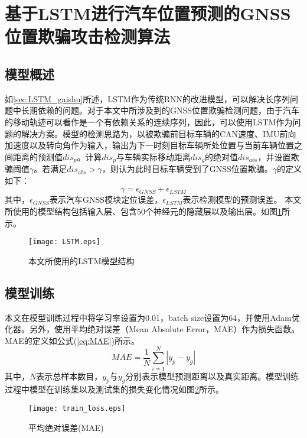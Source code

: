 \section{基于LSTM进行汽车位置预测的GNSS位置欺骗攻击检测算法}
\subsection{模型概述}
如\ref{sec:LSTM_gaishu}所述，LSTM作为传统RNN的改进模型，可以解决长序列问题中长期依赖的问题。对于本文中所涉及到的GNSS位置欺骗检测问题，由于汽车的移动轨迹可以看作是一个有依赖关系的连续序列，因此，可以使用LSTM作为问题的解决方案。模型的检测思路为，以被欺骗前目标车辆的CAN速度、IMU前向加速度以及转向角作为输入，输出为下一时刻目标车辆所处位置与当前车辆位置之间距离的预测值$dis_p$。计算$dis_p$与车辆实际移动距离$dis_g$的绝对值$dis_{abs}$，并设置欺骗阈值$\gamma$。若满足$dis_{abs}>\gamma$，则认为此时目标车辆受到了GNSS位置欺骗。$\gamma$的定义如下：
\begin{equation}
    \gamma=\epsilon_{GNSS}+\epsilon_{LSTM}
    \label{eq:gamma}
\end{equation}
其中，$\epsilon_{GNSS}$表示汽车GNSS模块定位误差，$\epsilon_{LSTM}$表示检测模型的预测误差。
本文所使用的模型结构包括输入层、包含50个神经元的隐藏层以及输出层。如图\ref{fig:my_model_arch}所示。
\begin{figure}[htbp]
    \begin{center}
        \texttt{[image: LSTM.eps]}
    \end{center}
    \caption{本文所使用的LSTM模型结构}
    \label{fig:my_model_arch}
\end{figure}

\subsection{模型训练}
\label{sec:model_train}
本文在模型训练过程中将学习率设置为0.01，batch size设置为64，并使用Adam优化器。另外，使用平均绝对误差（Mean Absolute Error，MAE）作为损失函数。MAE的定义如公式(\ref{eq:MAE})所示。
\begin{equation}
    MAE=\frac{1}{N}\sum_{i=1}^N|y_p-y_g|
    \label{eq:MAE}
\end{equation}
其中，$N$表示总样本数目，$y_p$与$y_g$分别表示模型预测距离以及真实距离。模型训练过程中模型在训练集以及测试集的损失变化情况如图\ref{fig:train_MAE_loss}所示。
\begin{figure}[htbp]
    \begin{center}
        \texttt{[image: train\_loss.eps]}
    \end{center}
    \caption{平均绝对误差(MAE)}
    \label{fig:train_MAE_loss}
\end{figure}

